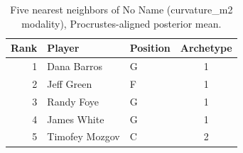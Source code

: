 \begin{table}[htbp]
  \centering\small
  \begin{tabular}{rllc}
    \toprule
    Rank & Player & Position & Archetype \\
    \midrule
    1 & Dana Barros & G & 1 \\
    2 & Jeff Green & F & 1 \\
    3 & Randy Foye & G & 1 \\
    4 & James White & G & 1 \\
    5 & Timofey Mozgov & C & 2 \\
    \bottomrule
  \end{tabular}
  \caption{Five nearest neighbors of No Name (curvature_m2 modality), Procrustes-aligned posterior mean.}
  \label{tab:No_Name_neighbors_curvature_m2}
\end{table}

